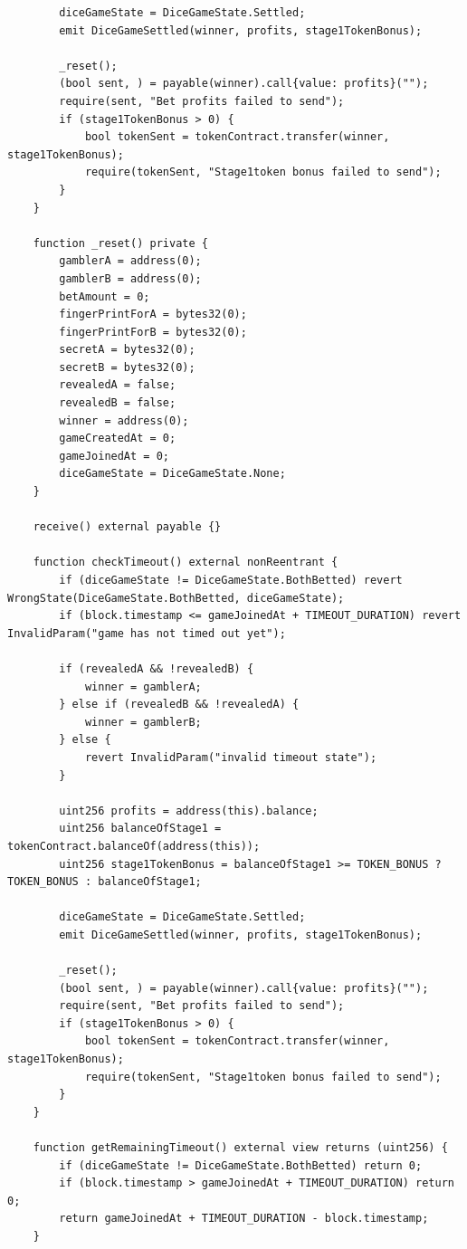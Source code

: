 \documentclass[10pt,a4paper]{article}
\begin{document}
\begin{lstlisting}
        diceGameState = DiceGameState.Settled;
        emit DiceGameSettled(winner, profits, stage1TokenBonus);

        _reset();
        (bool sent, ) = payable(winner).call{value: profits}("");
        require(sent, "Bet profits failed to send");
        if (stage1TokenBonus > 0) {
            bool tokenSent = tokenContract.transfer(winner, stage1TokenBonus);
            require(tokenSent, "Stage1token bonus failed to send");
        }
    }

    function _reset() private {
        gamblerA = address(0);
        gamblerB = address(0);
        betAmount = 0;
        fingerPrintForA = bytes32(0);
        fingerPrintForB = bytes32(0);
        secretA = bytes32(0);
        secretB = bytes32(0);
        revealedA = false;
        revealedB = false;
        winner = address(0);
        gameCreatedAt = 0;
        gameJoinedAt = 0;
        diceGameState = DiceGameState.None;
    }

    receive() external payable {}

    function checkTimeout() external nonReentrant {
        if (diceGameState != DiceGameState.BothBetted) revert WrongState(DiceGameState.BothBetted, diceGameState);
        if (block.timestamp <= gameJoinedAt + TIMEOUT_DURATION) revert InvalidParam("game has not timed out yet");
        
        if (revealedA && !revealedB) {
            winner = gamblerA;
        } else if (revealedB && !revealedA) {
            winner = gamblerB;
        } else {
            revert InvalidParam("invalid timeout state");
        }
        
        uint256 profits = address(this).balance;
        uint256 balanceOfStage1 = tokenContract.balanceOf(address(this));
        uint256 stage1TokenBonus = balanceOfStage1 >= TOKEN_BONUS ? TOKEN_BONUS : balanceOfStage1;

        diceGameState = DiceGameState.Settled;
        emit DiceGameSettled(winner, profits, stage1TokenBonus);

        _reset();
        (bool sent, ) = payable(winner).call{value: profits}("");
        require(sent, "Bet profits failed to send");
        if (stage1TokenBonus > 0) {
            bool tokenSent = tokenContract.transfer(winner, stage1TokenBonus);
            require(tokenSent, "Stage1token bonus failed to send");
        }
    }
    
    function getRemainingTimeout() external view returns (uint256) {
        if (diceGameState != DiceGameState.BothBetted) return 0;
        if (block.timestamp > gameJoinedAt + TIMEOUT_DURATION) return 0;
        return gameJoinedAt + TIMEOUT_DURATION - block.timestamp;
    }
    

\end{lstlisting}
\end{document}
